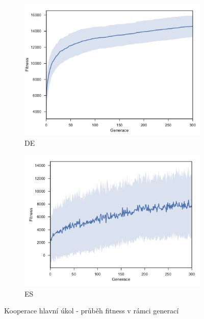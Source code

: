 	\begin{figure}[p]
		\centering
		\begin{subfigure}{.5\textwidth}
			\centering
			\includegraphics[width=\linewidth]{../img/WoodMap/DE/WoodCoopMem}
			\caption{DE}
			\label{obr04:CoopDE}
		\end{subfigure}%
		\begin{subfigure}{.5\textwidth}
			\centering
			\includegraphics[width=\linewidth]{../img/WoodMap/ES/WoodCoopES}
			\caption{ES}
			\label{obr04:CoopES}
		\end{subfigure}
		\caption{Kooperace  hlavní úkol  - průběh fitness v rámci generací}
		\label{obr04:Coop}
	\end{figure}
	\clearpage
	
